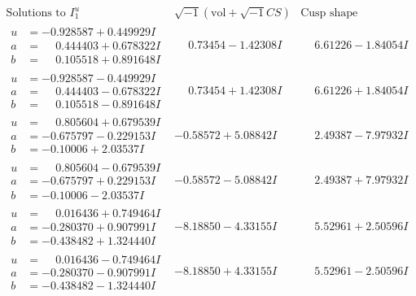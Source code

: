 \documentclass[1p]{elsarticle_modified}
\theoremstyle{definition}
\newcommand{\I}{\sqrt{-1}}
\begin{document}
$$\begin{array}{c|c|c}  
\text{Solutions to }I^u_{1}& \I (\text{vol} + \sqrt{-1}CS) & \text{Cusp shape}\\
 \hline 
\begin{aligned}
u &= -0.928587 + 0.449929 I \\
a &= \phantom{-}0.444403 + 0.678322 I \\
b &= \phantom{-}0.105518 + 0.891648 I\end{aligned}
 & \phantom{-}0.73454 - 1.42308 I & \phantom{-}6.61226 - 1.84054 I \\ \hline\begin{aligned}
u &= -0.928587 - 0.449929 I \\
a &= \phantom{-}0.444403 - 0.678322 I \\
b &= \phantom{-}0.105518 - 0.891648 I\end{aligned}
 & \phantom{-}0.73454 + 1.42308 I & \phantom{-}6.61226 + 1.84054 I \\ \hline\begin{aligned}
u &= \phantom{-}0.805604 + 0.679539 I \\
a &= -0.675797 - 0.229153 I \\
b &= -0.10006 + 2.03537 I\end{aligned}
 & -0.58572 + 5.08842 I & \phantom{-}2.49387 - 7.97932 I \\ \hline\begin{aligned}
u &= \phantom{-}0.805604 - 0.679539 I \\
a &= -0.675797 + 0.229153 I \\
b &= -0.10006 - 2.03537 I\end{aligned}
 & -0.58572 - 5.08842 I & \phantom{-}2.49387 + 7.97932 I \\ \hline\begin{aligned}
u &= \phantom{-}0.016436 + 0.749464 I \\
a &= -0.280370 + 0.907991 I \\
b &= -0.438482 + 1.324440 I\end{aligned}
 & -8.18850 - 4.33155 I & \phantom{-}5.52961 + 2.50596 I \\ \hline\begin{aligned}
u &= \phantom{-}0.016436 - 0.749464 I \\
a &= -0.280370 - 0.907991 I \\
b &= -0.438482 - 1.324440 I\end{aligned}
 & -8.18850 + 4.33155 I & \phantom{-}5.52961 - 2.50596 I \\ \hline\begin{aligned}

\end{aligned}
\end{array}$$
\end{document}
